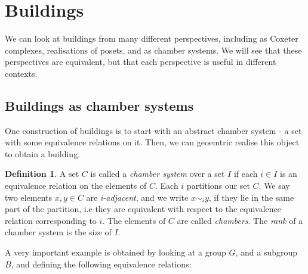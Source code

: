 \documentclass[11pt]{article}
\begin{document}
\newtheorem{theorem}{Theorem}
\theoremstyle{definition}
\newtheorem{definition}{Definition}
\newtheorem{proposition}{Proposition}
\newtheorem{example}{Example}
\newtheorem{lemma}{Lemma}
\newtheorem{corollary}{Corollary}
\newcommand{\uw}{\mathcal{U}(W,X)}
\newcommand{\W}{$(W,S)$}
\newcommand{\ix}{\textit}
\newcommand{\tr}{\textcolor{red}}
\newcommand{\sg}{$\Sigma$}




\section{Buildings}

We can look at buildings from many different perspectives, including as Coxeter complexes, realisations of posets, and as chamber systems. We will see that these perspectives are equivalent, but that each perspective is useful in different contexts. 

\subsection{Buildings as chamber systems}
One construction of buildings is to start with an abstract chamber system - a set with some equivalence relations on it. Then, we can geoemtric realise this object to obtain a building. 

\begin{definition}\cite[?]{RON}
    A set $C$ is called a \ix{chamber system} over a set $I$ if each $i\in I$ is an equivalence relation on the elements of $C$. Each $i$ partitions our set $C$. We say two elements $x,y\in C$ are \ix{i-adjacent}, and we write $x\sim_{i} y$, if they lie in the same part of the partition, i.e they are equivalent with respect to the equivalence relation corresponding to $i$. The elements of $C$ are called \ix{chambers}. The \ix{rank} of a chamber system is the size of $I$. 
\end{definition}


A very important example is obtained by looking at a group $G$, and a subgroup $B$, and defining the following equivalence relations: 
\end{document}
